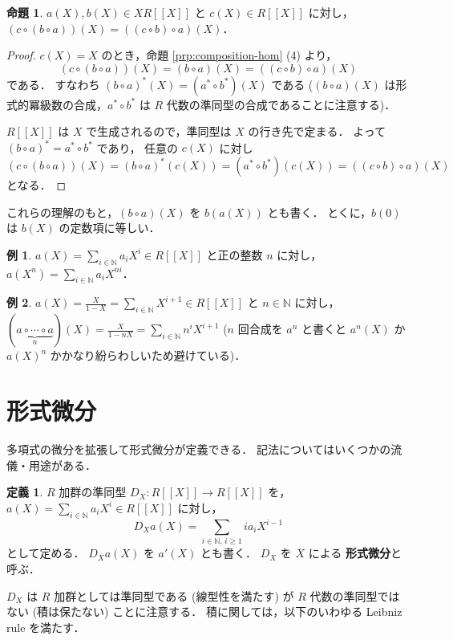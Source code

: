 \documentclass{jsarticle}
\newcommand{\N}{\mathbb{N}}
\newcommand{\longto}{\longrightarrow}
\theoremstyle{definition}
\newtheorem*{Dfn}{定義}
\newtheorem*{Exm}{例}
\newtheorem{Prp}{命題}
\newenvironment{dfn}{\vspace{1ex}\begin{screen}\begin{Dfn}}{\end{Dfn}\end{screen}\vspace{1ex}}
\newenvironment{exm}{\begin{leftbar}\begin{Exm}}{\end{Exm}\end{leftbar}}
\newenvironment{prp}{\vspace{1ex}\begin{screen}\begin{Prp}}{\end{Prp}\end{screen}}
\newenvironment{prf}{\begin{leftbar}\begin{proof}}{\end{proof}\end{leftbar}}
\begin{document}
\begin{prp}
  $a(X), b(X) \in X R[[X]]$ と $c(X) \in R[[X]]$ に対し，
  $(c \circ (b \circ a))(X) = ((c \circ b) \circ a)(X)$．
\end{prp}
\begin{prf}
  $c(X) = X$ のとき，命題 \ref{prp:composition-hom} (4) より，
  \[
    (c \circ (b \circ a))(X) = (b \circ a)(X) = ((c \circ b) \circ a)(X)
  \]
  である．
  すなわち $(b \circ a)^*(X) = (a^* \circ b^*)(X)$ である ($(b \circ a)(X)$ は形式的冪級数の合成，$a^* \circ b^*$ は $R$ 代数の準同型の合成であることに注意する)．

  $R[[X]]$ は $X$ で生成されるので，準同型は $X$ の行き先で定まる．
  よって $(b \circ a)^* = a^* \circ b^*$ であり，
  任意の $c(X)$ に対し
  \[
    (c \circ (b \circ a))(X) = (b \circ a)^*(c(X)) = (a^* \circ b^*)(c(X)) = ((c \circ b) \circ a)(X)
  \]
  となる．
\end{prf}



これらの理解のもと，$(b \circ a)(X)$ を $b(a(X))$ とも書く．
とくに，$b(0)$ は $b(X)$ の定数項に等しい．

\begin{exm}
  $a(X) = \sum_{i\in\N} a_i X^i \in R[[X]]$ と正の整数 $n$ に対し，
  $a(X^n) = \sum_{i\in\N} a_i X^{ni}$．
\end{exm}

\begin{exm}
  $a(X) = \frac{X}{1 - X} = \sum_{i\in\N} X^{i+1} \in R[[X]]$ と $n \in \N$ に対し，
  $(\underbrace{a \circ \cdots \circ a}_{n})(X) = \frac{X}{1 - n X} = \sum_{i\in\N} n^i X^{i+1}$
  ($n$ 回合成を $a^n$ と書くと $a^n(X)$ か $a(X)^n$ かかなり紛らわしいため避けている)．
\end{exm}


\section{形式微分}
多項式の微分を拡張して形式微分が定義できる．
記法についてはいくつかの流儀・用途がある．

\begin{dfn}
  $R$ 加群の準同型 $D_X\colon R[[X]] \longto R[[X]]$ を，
  $a(X) = \sum_{i\in\N} a_i X^i \in R[[X]]$ に対し，
  \[
    D_X a(X) = \sum_{i\in\N,\,i\ge 1} i a_i X^{i-1}
  \]
  として定める．
  $D_X a(X)$ を $a'(X)$ とも書く．
  $D_X$ を $X$ による \textbf{形式微分}と呼ぶ．
\end{dfn}

$D_X$ は $R$ 加群としては準同型である (線型性を満たす) が
$R$ 代数の準同型ではない (積は保たない) ことに注意する．
積に関しては，以下のいわゆる Leibniz rule を満たす．
\end{document}
